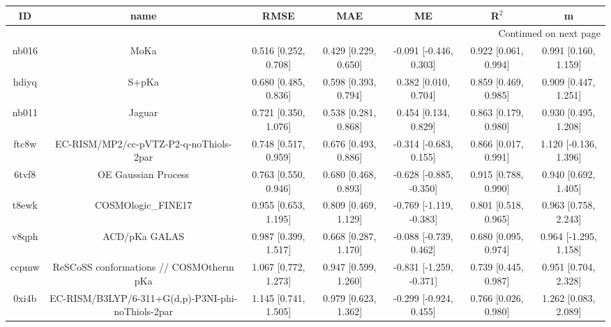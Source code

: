 \documentclass{article}
\begin{document}
\begin{center}
\begin{longtable}{|ccccccc|}
\toprule
    ID &                                               name &                     RMSE &                      MAE &                       ME &                 R$^2$ &                       m \\
\midrule
\endhead
\midrule
\multicolumn{7}{r}{{Continued on next page}} \\
\midrule
\endfoot

\bottomrule
\endlastfoot
 nb016 &                                               MoKa &     0.516 [0.252, 0.708] &     0.429 [0.229, 0.650] &   -0.091 [-0.446, 0.303] &  0.922 [0.061, 0.994] &    0.991 [0.160, 1.159] \\
 hdiyq &                                              S+pKa &     0.680 [0.485, 0.836] &     0.598 [0.393, 0.794] &     0.382 [0.010, 0.704] &  0.859 [0.469, 0.985] &    0.909 [0.447, 1.251] \\
 nb011 &                                             Jaguar &     0.721 [0.350, 1.076] &     0.538 [0.281, 0.868] &     0.454 [0.134, 0.829] &  0.863 [0.179, 0.980] &    0.930 [0.495, 1.208] \\
 ftc8w &             EC-RISM/MP2/cc-pVTZ-P2-q-noThiols-2par &     0.748 [0.517, 0.959] &     0.676 [0.493, 0.886] &   -0.314 [-0.683, 0.155] &  0.866 [0.017, 0.991] &   1.120 [-0.136, 1.396] \\
 6tvf8 &                                OE Gaussian Process &     0.763 [0.550, 0.946] &     0.680 [0.468, 0.893] &  -0.628 [-0.885, -0.350] &  0.915 [0.788, 0.990] &    0.940 [0.692, 1.405] \\
 t8ewk &                                 COSMOlogic\_FINE17 &     0.955 [0.653, 1.195] &     0.809 [0.469, 1.129] &  -0.769 [-1.119, -0.383] &  0.801 [0.518, 0.965] &    0.963 [0.758, 2.243] \\
 v8qph &                                      ACD/pKa GALAS &     0.987 [0.399, 1.517] &     0.668 [0.287, 1.170] &   -0.088 [-0.739, 0.462] &  0.680 [0.095, 0.974] &   0.964 [-1.295, 1.158] \\
 ccpmw &            ReSCoSS conformations // COSMOtherm pKa &     1.067 [0.772, 1.273] &     0.947 [0.599, 1.260] &  -0.831 [-1.259, -0.371] &  0.739 [0.445, 0.987] &    0.951 [0.704, 2.328] \\
 0xi4b &  EC-RISM/B3LYP/6-311+G(d,p)-P3NI-phi-noThiols-2par &     1.145 [0.741, 1.505] &     0.979 [0.623, 1.362] &   -0.299 [-0.924, 0.455] &  0.766 [0.026, 0.980] &    1.262 [0.083, 2.089] \\

\end{longtable}
\end{center}
\end{document}
